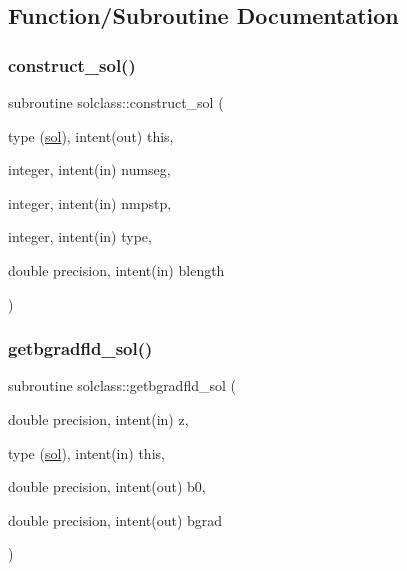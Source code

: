 \subsection{Function/\+Subroutine Documentation}
\mbox{\label{namespacesolclass_a2307b36cefac8604240e62757dd08cb9}} 
\subsubsection{\texorpdfstring{construct\_sol()}{construct\_sol()}}
{\footnotesize\ttfamily subroutine solclass\+::construct\+\_\+sol (\begin{DoxyParamCaption}\item[{type (\mbox{\hyperlink{namespacesolclass_structsolclass_1_1sol}{sol}}), intent(out)}]{this,  }\item[{integer, intent(in)}]{numseg,  }\item[{integer, intent(in)}]{nmpstp,  }\item[{integer, intent(in)}]{type,  }\item[{double precision, intent(in)}]{blength }\end{DoxyParamCaption})}

\mbox{\label{namespacesolclass_ad89ee3db004c00d4f2e128ddbf03ce32}} 
\subsubsection{\texorpdfstring{getbgradfld\_sol()}{getbgradfld\_sol()}}
{\footnotesize\ttfamily subroutine solclass\+::getbgradfld\+\_\+sol (\begin{DoxyParamCaption}\item[{double precision, intent(in)}]{z,  }\item[{type (\mbox{\hyperlink{namespacesolclass_structsolclass_1_1sol}{sol}}), intent(in)}]{this,  }\item[{double precision, intent(out)}]{b0,  }\item[{double precision, intent(out)}]{bgrad }\end{DoxyParamCaption})}

\mbox{\label{namespacesolclass_a7a865f7ab4470f9bff328ed98aacd7c8}} 
